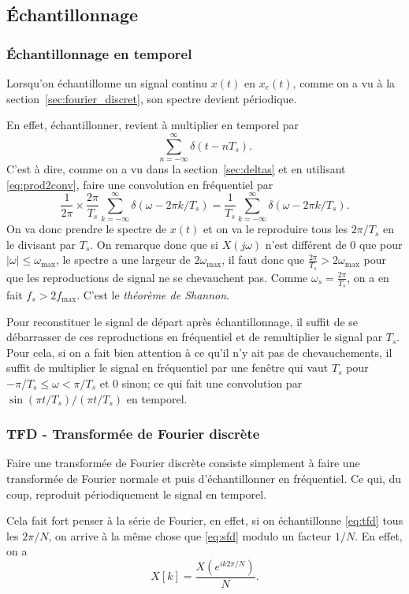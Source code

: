 \subsection{Échantillonnage}
\label{sec:sampling}
\subsubsection{Échantillonnage en temporel}
Lorsqu'on échantillonne un signal continu $x(t)$ en $x_e(t)$,
comme on a vu à la section~\ref{sec:fourier_discret},
son spectre devient périodique.

En effet, échantillonner,
revient à multiplier en temporel par
\[ \sum_{n=-\infty}^{\infty} \delta(t-nT_s). \]
C'est à dire, comme on a vu dans la section~\ref{sec:deltas} et
en utilisant \eqref{eq:prod2conv},
faire une convolution en fréquentiel par
\[ \frac{1}{2\pi} \times
\frac{2\pi}{T_s}\sum_{k=-\infty}^\infty\delta(\omega-2\pi k/T_s)
= \frac{1}{T_s}\sum_{k=-\infty}^\infty\delta(\omega-2\pi k/T_s). \]
On va donc prendre le spectre de $x(t)$ et on va le reproduire tous les
$2\pi/T_s$ en le divisant par $T_s$.
On remarque donc que si $X(j\omega)$ n'est différent de 0 que pour
$|\omega| \leq \omega_\mathrm{max}$,
le spectre a une largeur de $2\omega_\mathrm{max}$,
il faut donc que $\frac{2\pi}{T_s} > 2\omega_\mathrm{max}$ pour que les
reproductions de signal ne se chevauchent pas.
Comme $\omega_s = \frac{2\pi}{T_s}$, on a en fait $f_s > 2f_\mathrm{max}$.
C'est le \emph{théorème de Shannon}.

Pour reconstituer le signal de départ après échantillonnage,
il suffit de se débarrasser de ces reproductions en fréquentiel
et de remultiplier le signal par $T_s$.
Pour cela, si on a fait bien attention à
ce qu'il n'y ait pas de chevauchements,
il suffit de multiplier le signal en fréquentiel par une fenêtre
qui vaut $T_s$ pour $-\pi/T_s \leq \omega < \pi/T_s$ et 0 sinon;
ce qui fait une convolution par $\sin(\pi t/T_s)/(\pi t/T_s)$ en temporel.

\subsubsection{TFD - Transformée de Fourier discrète}
Faire une transformée de Fourier discrète consiste simplement à faire une
transformée de Fourier normale et puis d'échantillonner en fréquentiel.
Ce qui, du coup, reproduit périodiquement le signal en temporel.

Cela fait fort penser à la série de Fourier, en effet,
si on échantillonne \eqref{eq:tfd} tous les $2\pi/N$, on arrive
à la même chose que \eqref{eq:sfd} modulo un facteur $1/N$.
En effet, on a
\[ X[k] = \frac{X(e^{ik2\pi/N})}{N}. \]

